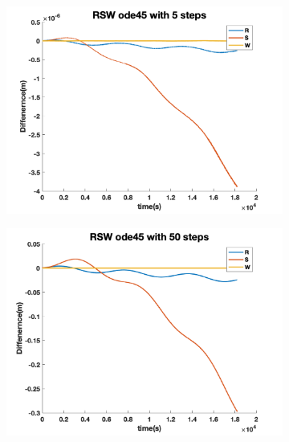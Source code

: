 \documentclass[12pt
,headinclude
,headsepline
,bibtotocnumbered
]{scrartcl}
\begin{document}
\begin{figure}[H]
\begin{subfigure}[b]{0.45\textwidth}
    \includegraphics[width=1\textwidth]{./plots/ode45_5_yprime_RSW.png}
    \end{subfigure}
    \begin{subfigure}[b]{0.45\textwidth}
    \includegraphics[width=1\textwidth]{./plots/ode45_50_yprime_RSW.png}
    \end{subfigure}
    \end{figure}
\end{document}
